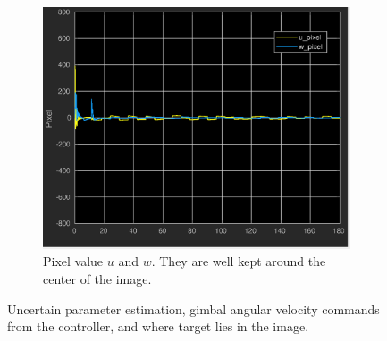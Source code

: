 \begin{figure}[htbp]
\begin{subfigure}{0.5\textwidth}
		\includegraphics[width=\linewidth]{images/chapter2/uav_pixel}
		\caption{Pixel value $u$ and $w$. They are well kept around the center of the image.}
	\end{subfigure}	
	\caption{Uncertain parameter estimation, gimbal angular velocity commands from the controller, and where target lies in the image.}
	\label{uav_adaptive_additional}
\end{figure}

